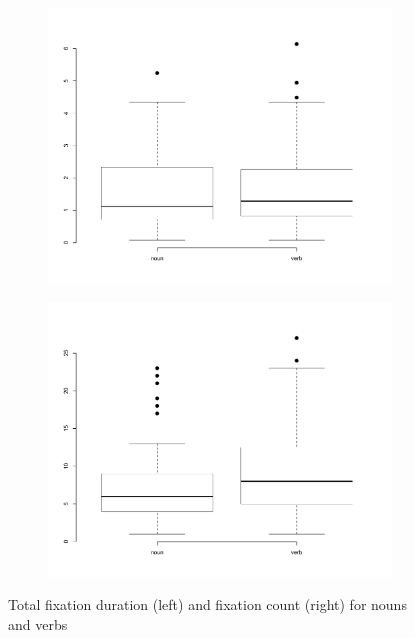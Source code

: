 \documentclass[output=paper]{LSP/langsci}
\begin{document}
\begin{figure}[t]
	\begin{subfigure}{.47\textwidth}
  	\centering
  	\includegraphics[width=\linewidth]{figures/serbinaetal/serbinaetal2.pdf}
	\end{subfigure}
    \begin{subfigure}{.47\textwidth}
  	\centering
  	\includegraphics[width=\linewidth]{figures/serbinaetal/serbinaetal3.pdf}
	\end{subfigure}
\caption{Total fixation duration (left) and fixation count (right) for nouns and verbs}
\label{serbinaetal:fig:3}
\end{figure}
  
\end{document}
